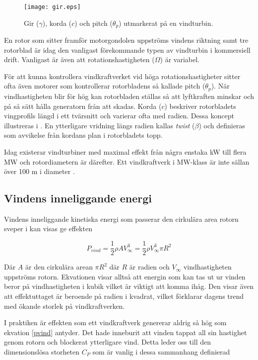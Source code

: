 \begin{figure}[!htb]
  \centering
  \texttt{[image: gir.eps]}
  \caption{Gir ($\gamma$), korda ($c$) och pitch ($\theta_p$)  utmarkerat på en vindturbin.}
  \label{gir}
\end{figure}

En rotor som sitter framför motorgondolen uppströms vindens riktning samt tre rotorblad är idag den vanligast förekommande typen av vindturbin i kommersiell drift. Vanligast är även att rotationshastigheten ($\Omega$) är variabel.

För att kunna kontrollera vindkraftverket vid höga rotationshastigheter sitter ofta även motorer som kontrollerar rotorbladens så kallade pitch ($\theta_p$). När vindhastigheten blir för hög kan rotorbladen ställas så att lyftkraften minskar och på så sätt hålla generatorn från att skadas. Korda ($c$) beskriver rotorbladets vingprofils längd i ett tvärsnitt och varierar ofta med radien. Dessa koncept illustreras i . En ytterligare vridning längs radien kallas \emph{twist} ($\beta$) och definieras som avvikelse från kordans plan i rotorbladets topp.

Idag existerar vindturbiner med maximal effekt från några enstaka kW till flera MW och rotordiametern är därefter. Ett vindkraftverk i MW-klass är inte sällan över 100 m i diameter \citep{kap10}.

\subsection{Vindens inneliggande energi}
Vindens inneliggande kinetiska energi som passerar den cirkulära area rotorn sveper i  kan visas ge effekten

\begin{equation}\label{pvind} P_{vind} = \frac{1}{2}\rho A V_{\infty}^{3}  =  \frac{1}{2}\rho V_{\infty}^{3}\pi R^2 \end{equation}

Där $A$ är den cirkulära arean $\pi R^2$ där $R$ är radien och $V_\infty$ vindhastigheten uppströms rotorn. Ekvationen visar alltså att energin som kan tas ut ur vinden beror på vindhastigheten i kubik vilket är viktigt att komma ihåg. Den visar även att effektuttaget är beroende på radien i kvadrat, vilket förklarar dagens trend med ökande storlek på vindkraftverken.

I praktiken är effekten som ett vindkraftverk genererar aldrig så hög som ekvation \ref{pvind} antyder. Det hade inneburit att vinden tappat all sin hastighet genom rotorn och blockerat ytterligare vind. Detta leder oss till den dimensionslösa storheten $C_P$ som är vanlig i dessa sammanhang definierad

